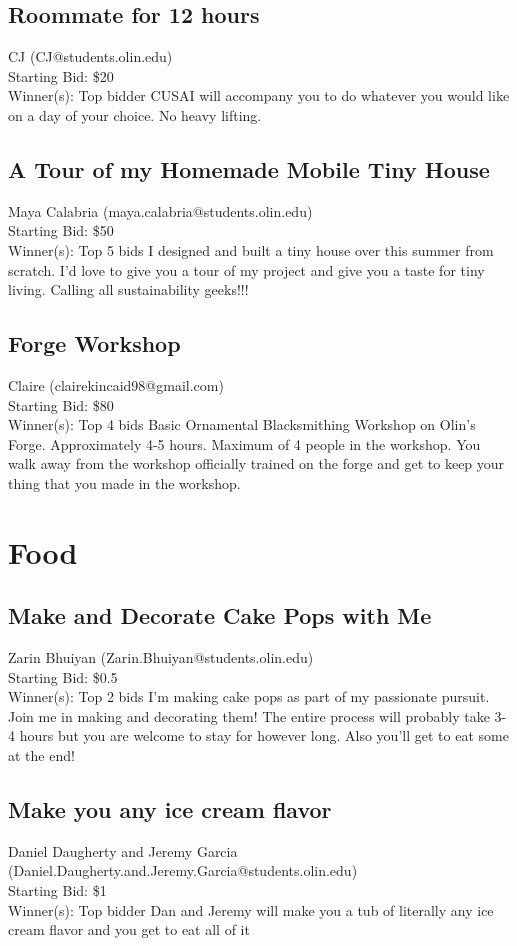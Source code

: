 \documentclass[11pt]{article}
\begin{document}
\subsection{Roommate for 12 hours}
CJ (CJ@students.olin.edu) \\
Starting Bid: \$20 \\
Winner(s): 
Top bidder\newline
CUSAI will accompany you to do whatever you would like on a day of your choice. No heavy lifting.
\subsection{A Tour of my Homemade Mobile Tiny House}
Maya Calabria (maya.calabria@students.olin.edu) \\
Starting Bid: \$50 \\
Winner(s): 
Top 5 bids\newline
I designed and built a tiny house over this summer from scratch. I'd love to give you a tour of my project and give you a taste for tiny living. Calling all sustainability geeks!!!
\subsection{Forge Workshop}
Claire  (clairekincaid98@gmail.com) \\
Starting Bid: \$80 \\
Winner(s): 
Top 4 bids\newline
Basic Ornamental Blacksmithing Workshop on Olin's Forge.  Approximately 4-5 hours.  Maximum of 4 people in the workshop.  You walk away from the workshop officially trained on the forge and get to keep your thing that you made in the workshop.
\section{Food}
\subsection{Make and Decorate Cake Pops with Me}
Zarin Bhuiyan (Zarin.Bhuiyan@students.olin.edu) \\
Starting Bid: \$0.5 \\
Winner(s): 
Top 2 bids\newline
I'm making cake pops as part of my passionate pursuit. Join me in making and decorating them! The entire process will probably take 3-4 hours but you are welcome to stay for however long. Also you'll get to eat some at the end!
\subsection{Make you any ice cream flavor}
Daniel Daugherty and Jeremy Garcia (Daniel.Daugherty.and.Jeremy.Garcia@students.olin.edu) \\
Starting Bid: \$1 \\
Winner(s): 
Top bidder\newline
Dan and Jeremy will make you a tub of literally any ice cream flavor and you get to eat all of it
\end{document}
